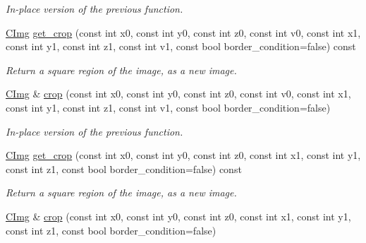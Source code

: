\begin{DoxyCompactItemize}
\begin{DoxyCompactList}\small\item\em In-\/place version of the previous function. \end{DoxyCompactList}\item 
\hyperlink{structcimg__library_1_1_c_img}{C\-Img} \hyperlink{structcimg__library_1_1_c_img_aa9c7b716b8e131422b7b9dc32690ed0c}{get\-\_\-crop} (const int x0, const int y0, const int z0, const int v0, const int x1, const int y1, const int z1, const int v1, const bool border\-\_\-condition=false) const 
\begin{DoxyCompactList}\small\item\em Return a square region of the image, as a new image. \end{DoxyCompactList}\item 
\hypertarget{structcimg__library_1_1_c_img_a5d8383dda3f02868a2d4d4766575bdab}{\hyperlink{structcimg__library_1_1_c_img}{C\-Img} \& \hyperlink{structcimg__library_1_1_c_img_a5d8383dda3f02868a2d4d4766575bdab}{crop} (const int x0, const int y0, const int z0, const int v0, const int x1, const int y1, const int z1, const int v1, const bool border\-\_\-condition=false)}\label{structcimg__library_1_1_c_img_a5d8383dda3f02868a2d4d4766575bdab}

\begin{DoxyCompactList}\small\item\em In-\/place version of the previous function. \end{DoxyCompactList}\item 
\hyperlink{structcimg__library_1_1_c_img}{C\-Img} \hyperlink{structcimg__library_1_1_c_img_a6427803ba86b2a75950dd7ec2c76a52b}{get\-\_\-crop} (const int x0, const int y0, const int z0, const int x1, const int y1, const int z1, const bool border\-\_\-condition=false) const 
\begin{DoxyCompactList}\small\item\em Return a square region of the image, as a new image. \end{DoxyCompactList}\item 
\hypertarget{structcimg__library_1_1_c_img_a148d3cac614d72b9c1fc0cc669fd578c}{\hyperlink{structcimg__library_1_1_c_img}{C\-Img} \& \hyperlink{structcimg__library_1_1_c_img_a148d3cac614d72b9c1fc0cc669fd578c}{crop} (const int x0, const int y0, const int z0, const int x1, const int y1, const int z1, const bool border\-\_\-condition=false)}\label{structcimg__library_1_1_c_img_a148d3cac614d72b9c1fc0cc669fd578c}


\end{DoxyCompactItemize}
